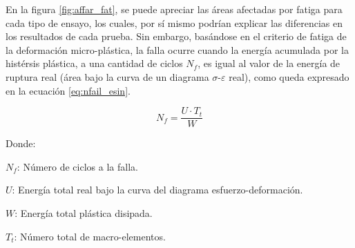 En la figura \ref{fig:affar_fat}, se puede apreciar las áreas afectadas por fatiga para cada tipo de ensayo, los cuales, por sí mismo podrían explicar las diferencias en los resultados de cada prueba. Sin embargo, basándose en el criterio de fatiga de la deformación micro-plástica, la falla ocurre cuando la energía acumulada por la histérsis plástica, a una cantidad de ciclos $N_f$, es igual al valor de la energía de ruptura real (área bajo la curva de un diagrama $\sigma$-$\varepsilon$ real), como queda expresado en la ecuación \ref{eq:nfail_esin}.

\begin{equation}\label{eq:nfail_esin}
	N_f = \frac{U \cdot T_t}{W} 
\end{equation}

Donde:
\begin{itemize*}
	\item $N_f$: Número de ciclos a la falla.
	\item $U$: Energía total real bajo la curva del diagrama esfuerzo-deformación.
	\item $W$: Energía total plástica disipada.
	\item $T_t$: Número total de macro-elementos.
\end{itemize*}

